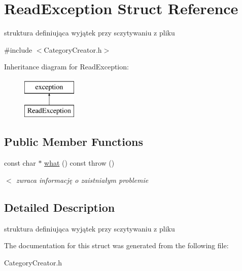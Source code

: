 \hypertarget{struct_read_exception}{}\section{Read\+Exception Struct Reference}
\label{struct_read_exception}


struktura definiująca wyjątek przy sczytywaniu z pliku  




{\ttfamily \#include $<$Category\+Creator.\+h$>$}

Inheritance diagram for Read\+Exception\+:\begin{figure}[H]
\begin{center}
\leavevmode
\includegraphics[height=2.000000cm]{struct_read_exception}
\end{center}
\end{figure}
\subsection*{Public Member Functions}
\begin{DoxyCompactItemize}
\item 
\mbox{\label{struct_read_exception_a2f2e63822f7dfb9fdc0f5464717c52b8}} 
const char $\ast$ \mbox{\hyperlink{struct_read_exception_a2f2e63822f7dfb9fdc0f5464717c52b8}{what}} () const  throw ()
\begin{DoxyCompactList}\small\item\em $<$ zwraca informację o zaistniałym problemie \end{DoxyCompactList}\end{DoxyCompactItemize}


\subsection{Detailed Description}
struktura definiująca wyjątek przy sczytywaniu z pliku 

The documentation for this struct was generated from the following file\+:\begin{DoxyCompactItemize}
\item 
Category\+Creator.\+h\end{DoxyCompactItemize}

